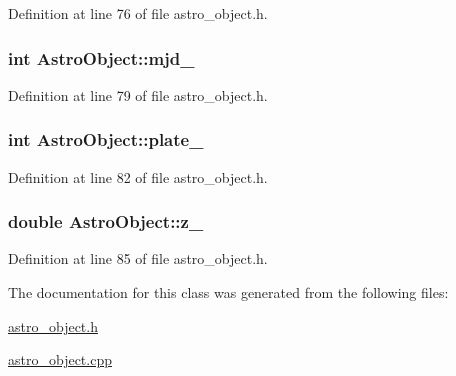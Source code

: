 Definition at line 76 of file astro\-\_\-object.\-h.

\hypertarget{class_astro_object_ac39bfb302dba24582e9f48147a30a320}{
\subsubsection[{mjd\-\_\-}]{\setlength{\rightskip}{0pt plus 5cm}int {\bf Astro\-Object\-::mjd\-\_\-}}}\label{class_astro_object_ac39bfb302dba24582e9f48147a30a320}


Definition at line 79 of file astro\-\_\-object.\-h.

\hypertarget{class_astro_object_ac0b8a9a01565519345047fae0d6fe659}{
\subsubsection[{plate\-\_\-}]{\setlength{\rightskip}{0pt plus 5cm}int {\bf Astro\-Object\-::plate\-\_\-}}}\label{class_astro_object_ac0b8a9a01565519345047fae0d6fe659}


Definition at line 82 of file astro\-\_\-object.\-h.

\hypertarget{class_astro_object_a07239818f3076c2a4ff0a3af0222b5e1}{
\subsubsection[{z\-\_\-}]{\setlength{\rightskip}{0pt plus 5cm}double {\bf Astro\-Object\-::z\-\_\-}}}\label{class_astro_object_a07239818f3076c2a4ff0a3af0222b5e1}


Definition at line 85 of file astro\-\_\-object.\-h.



The documentation for this class was generated from the following files\-:\begin{DoxyCompactItemize}
\item 
\hyperlink{astro__object_8h}{astro\-\_\-object.\-h}\item 
\hyperlink{astro__object_8cpp}{astro\-\_\-object.\-cpp}\end{DoxyCompactItemize}
